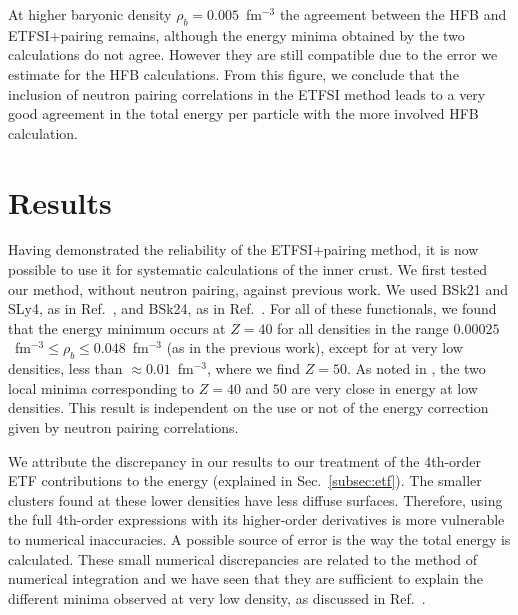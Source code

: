 \documentclass[
    amsmath,amssymb,
    aps,
    prc,
    floatfix,
]{revtex4-2}
\begin{document}
At higher baryonic density $\rho_b=0.005$~fm$^{-3}$ the agreement between the HFB and ETFSI+pairing remains, although the energy minima obtained by the two calculations do not agree. However they are still compatible due to the error we estimate for the HFB calculations. From this figure, we conclude that the inclusion of neutron pairing correlations in the ETFSI method leads to a very good agreement in the total energy per particle with the more involved HFB calculation.


\section{Results}\label{sec:results}

Having demonstrated the reliability of the ETFSI+pairing method, it is now possible to use it for systematic calculations of the inner crust. We first tested our method, without neutron pairing, against previous work. We used BSk21 and SLy4, as in Ref.~\cite{pearsonInnerCrustNeutron2012}, and BSk24, as in Ref.~\cite{pearsonUnifiedEquationsState2018,pearsonErratumUnifiedEquations2019}. For all of these functionals, we found that the energy minimum occurs at $Z=40$ for all densities in the range $0.00025$~fm$^{-3}\leq\rho_b\leq0.048$~fm$^{-3}$ (as in the previous work), except for at very low densities, less than $\approx0.01$~fm$^{-3}$, where we find $Z=50$. As noted in \cite{pearsonInnerCrustNeutron2012}, the two local minima corresponding to $Z=40$ and $50$ are very close in energy at low densities. This result is independent on the use or not of the energy correction given by neutron pairing correlations.

We attribute the discrepancy in our results to our treatment of the 4th-order ETF contributions to the energy (explained in Sec.~\ref{subsec:etf}). The smaller clusters found at these lower densities have less diffuse surfaces. Therefore, using the full 4th-order expressions with its higher-order derivatives is more vulnerable to numerical inaccuracies. A possible source of error is the way the total energy is calculated. These small numerical discrepancies are related to the method of numerical integration and we have seen that they are sufficient to explain the different minima observed at very low density, as discussed in Ref.~\cite{pearsonInnerCrustNeutron2012}.
\end{document}
